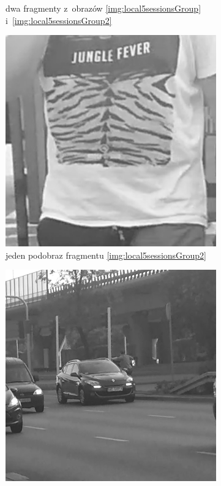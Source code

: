 \begin{figure}[h!]
\begin{subfigure}{.24\linewidth}
		\caption{dwa fragmenty z~obrazów \ref{img:local5sessionsGroup} i~\ref{img:local5sessionsGroup2}}
	\end{subfigure}
	\hfill	
	\begin{subfigure}{.24\linewidth}\centering
		\centering
		\includegraphics[width=1\textwidth]{img/5sessions/02-wrong-04}
		\caption{jeden podobraz fragmentu \ref{img:local5sessionsGroup2}}
	\end{subfigure}
	\hfill	
	\begin{subfigure}{.24\linewidth}\centering
		\centering
		\includegraphics[width=1\textwidth]{img/5sessions/02-wrong-06}

\end{subfigure}
\end{figure}
